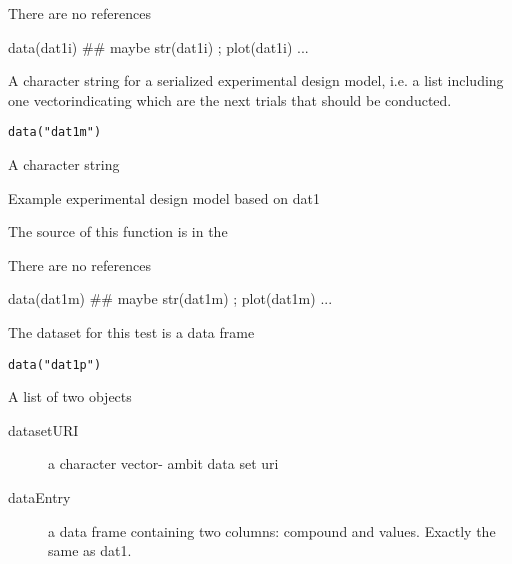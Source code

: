 \documentclass[letterpaper]{book}
\begin{document}
%
\begin{References}\relax
There are no references
\end{References}
%
\begin{Examples}
\begin{ExampleCode}
data(dat1i)
## maybe str(dat1i) ; plot(dat1i) ...
\end{ExampleCode}
\end{Examples}
%
\begin{Description}\relax
A character string for a serialized experimental design model, i.e. a list including one vectorindicating which are the next trials that should be conducted.
\end{Description}
%
\begin{Usage}
\begin{verbatim}
data("dat1m")
\end{verbatim}
\end{Usage}
%
\begin{Format}
A character string
\end{Format}
%
\begin{Details}\relax
Example experimental design model based on dat1
\end{Details}
%
\begin{Source}\relax
The source of this function is in the
\end{Source}
%
\begin{References}\relax
There are no references
\end{References}
%
\begin{Examples}
\begin{ExampleCode}
data(dat1m)
## maybe str(dat1m) ; plot(dat1m) ...
\end{ExampleCode}
\end{Examples}
%
\begin{Description}\relax
The dataset for this test is a data frame
\end{Description}
%
\begin{Usage}
\begin{verbatim}
data("dat1p")
\end{verbatim}
\end{Usage}
%
\begin{Format}
A list of two objects
\begin{description}

\item[datasetURI] a character vector- ambit data set uri
\item[dataEntry] a data frame containing two columns: compound and values. Exactly the same as dat1.

\end{description}

\end{Format}
\end{document}
